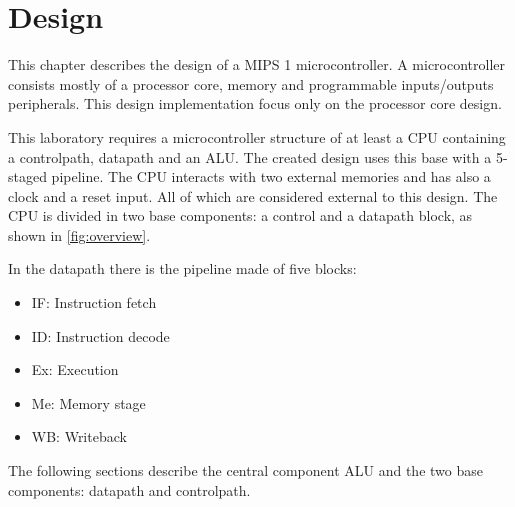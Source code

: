 \chapter{Design}
This chapter describes the design of a MIPS 1 microcontroller. A microcontroller consists mostly of a processor core, memory and programmable inputs/outputs peripherals. 
This design implementation focus only on the processor core design.

This laboratory requires a microcontroller structure of at least a CPU containing a controlpath, datapath and an ALU. The created design uses this base with a 5-staged pipeline.
The CPU interacts with two external memories and has also a clock and a reset input. All of which are considered external to this design.
The CPU is divided in two base components: a control and a datapath block, as shown  in \autoref{fig:overview}.

\begin{figure}[h]
\end{figure} 

In the datapath there is the pipeline made of five blocks:
\begin{itemize}
 \item IF: Instruction fetch
 \item ID: Instruction decode
 \item Ex: Execution
 \item Me: Memory stage
 \item WB: Writeback
\end{itemize}

The following sections describe the central component ALU and the two base components: datapath and controlpath.


	
	